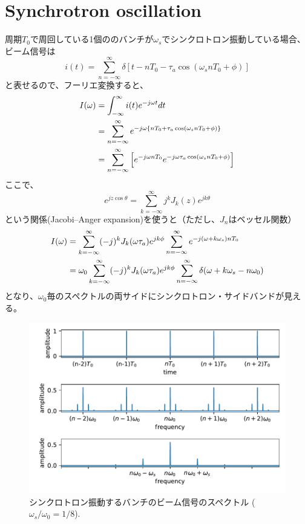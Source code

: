 \documentclass[]{jlreq}
\theoremstyle{definition}
\begin{document}
\section{Synchrotron oscillation}
周期$T_0$で周回している1個ののバンチが$\omega_s$でシンクロトロン振動している場合、ビーム信号は
%
\begin{equation}
  i(t) = \sum_{n=-\infty}^{\infty}\delta[t - n T_0 - \tau_a \cos(\omega_s n T_0 + \phi)]
\end{equation}
%
と表せるので、フーリエ変換すると、
%
\begin{align}
  I(\omega) &= \int_{-\infty}^{\infty} i(t) e^{-j\omega t} dt \notag\\
  &= \sum_{n = -\infty}^{\infty} e^{-j\omega\{n T_0 + \tau_a \cos(\omega_s n T_0 + \phi)\}} \notag\\
  &= \sum_{n = -\infty}^{\infty} \left[ e^{-j\omega n T_0 } e^{-j \omega \tau_a \cos(\omega_s n T_0 + \phi)} \right]
\end{align}
%
ここで、
%
\begin{equation}
  e^{jz\cos\theta} = \sum_{k = -\infty}^{\infty} j^k J_k(z) e^{j k \theta}
\end{equation}
%
という関係(Jacobi–Anger expansion)を使うと（ただし、$J_n$はベッセル関数）
%
\begin{align}
  I(\omega) &= \sum_{k = -\infty}^{\infty} (-j)^k J_k(\omega \tau_a) e^{j k \phi}
      \sum_{n = -\infty}^{\infty} e^{-j (\omega + k \omega_s) n T_0} \notag\\
    &= \omega_0 \sum_{k = -\infty}^{\infty} (-j)^k J_k(\omega \tau_a) e^{j k \phi}
        \sum_{n = -\infty}^{\infty} \delta(\omega + k\omega_s - n \omega_0)
\end{align}
%
となり、$\omega_0$毎のスペクトルの両サイドにシンクロトロン・サイドバンドが見える。
%
\begin{figure}[hbt]
  \begin{center}
    \includegraphics[width=12cm,clip]{synchrotron_bunch.pdf}
    \caption{シンクロトロン振動するバンチのビーム信号のスペクトル ($\omega_s/\omega_0 = 1/8$).}
   \label{synchro_bunch}
  \end{center}
\end{figure}
\clearpage
\end{document}
